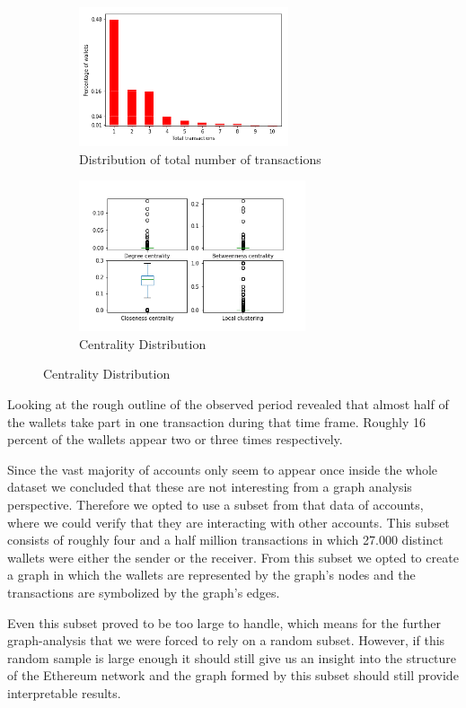 \begin{figure}[t]
\centering
\begin{subfigure}[b]{0.5\textwidth}
\centering
\includegraphics[height=155px]{../pics/distribution.png}
\caption{Distribution of total number of transactions}
\end{subfigure}%
\begin{subfigure}[b]{0.5\textwidth}
\centering
\includegraphics[height=168px]{../analysis/centrality.png}
\caption{Centrality Distribution}
\label{centralitydist}
\end{subfigure}
\end{figure}

Looking at the rough outline of the observed period revealed that almost half of the wallets take part in one transaction during that time frame.
Roughly 16 percent of the wallets appear two or three times respectively.

Since the vast majority of accounts only seem to appear once inside the whole dataset we concluded that these are not interesting from a graph analysis perspective. 
Therefore we opted to use a subset from that data of accounts, where we could verify that they are interacting with other accounts. 
This subset consists of roughly four and a half million transactions in which 27.000 distinct wallets were either the sender or the receiver. 
From this subset we opted to create a graph in which the wallets are represented by the graph's nodes and the transactions are symbolized by the graph's edges.

Even this subset proved to be too large to handle, which means for the further graph-analysis that we were forced to rely on a random subset. 
However, if this random sample is large enough it should still give us an insight into the structure of the Ethereum network and the graph formed by this subset should still provide interpretable results.

